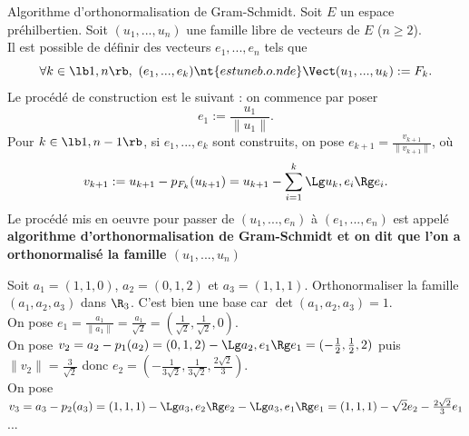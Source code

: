 \documentclass[11pt]{article}
\begin{document}
\begin{prop}{Algorithme d'orthonormalisation de Gram-Schmidt.}{}
    Soit $E$ un espace préhilbertien. Soit $(u_1,...,u_n)$ une famille libre de vecteurs de $E$ ($n\geq2$).\\
    Il est possible de définir des vecteurs $e_1,...,e_n$ tels que
    \begin{equation*}
        \forall k \in \lb1,n\rb, ~ (e_1,...,e_k) \nt{ est une b.o.n de } \Vect(u_1,...,u_k):=F_k.
    \end{equation*}
    Le procédé de construction est le suivant : on commence par poser
    \begin{equation*}
        e_1 := \frac{u_1}{\|u_1\|}.
    \end{equation*}
    Pour $k\in\lb1,n-1\rb$, si $e_1,...,e_k$ sont construits, on pose $e_{k+1}=\frac{v_{k+1}}{\|v_{k+1}\|}$, où
    \begin{equation*}
        v_{k+1}:=u_{k+1}-p_{F_k}(u_{k+1})=u_{k+1}-\sum_{i=1}^k\Lg u_k,e_i\Rg e_i.
    \end{equation*}
    Le procédé mis en oeuvre pour passer de $(u_1,...,e_n)$ à $(e_1,...,e_n)$ est appelé \bf{algorithme d'orthonormalisation de Gram-Schmidt} et on dit que l'on a orthonormalisé la famille $(u_1,...,u_n)$
\end{prop}

\vspace*{-0.7cm}

\begin{ex}{}{}
    Soit $a_1=(1,1,0)$, $a_2=(0,1,2)$ et $a_3=(1,1,1)$. Orthonormaliser la famille $(a_1,a_2,a_3)$ dans $\R_3$.
    \tcblower
    C'est bien une base car $\det(a_1,a_2,a_3)=1$.\\
    On pose $e_1 = \frac{a_1}{\|a_1\|}=\frac{a_1}{\sqrt{2}}=(\frac{1}{\sqrt{2}}, \frac{1}{\sqrt{2}}, 0)$.\\
    On pose $v_2 = a_2 - p_1(a_2) = (0,1,2) - \Lg a_2, e_1 \Rg e_1 = (-\frac{1}{2},\frac{1}{2},2)$ puis $\|v_2\|=\frac{3}{\sqrt{2}}$ donc $e_2=(-\frac{1}{3\sqrt{2}}, \frac{1}{3\sqrt{2}}, \frac{2\sqrt{2}}{3})$.\\
    On pose $v_3 = a_3 - p_2(a_3) = (1,1,1) - \Lg a_3, e_2 \Rg e_2 - \Lg a_3, e_1\Rg e_1 = (1,1,1)-\sqrt{2}e_2-\frac{2\sqrt{2}}{3}e_1$ ...
\end{ex}

\vspace*{-0.7cm}
\end{document}
